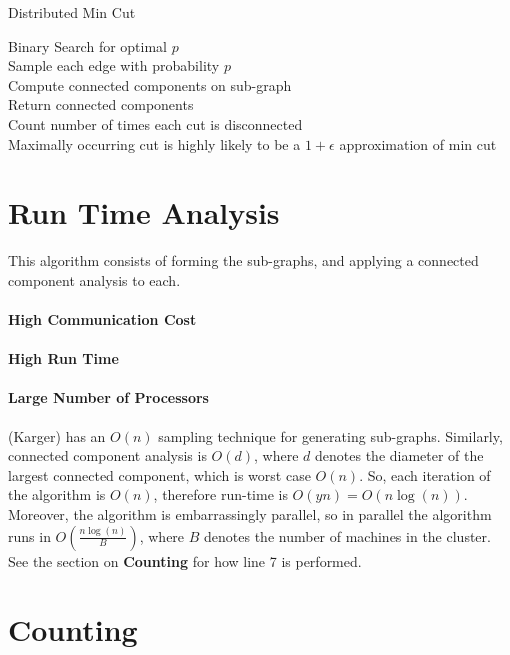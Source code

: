 \documentclass[12pt]{article}
\begin{document}
\LinesNumbered
\begin{algorithm}[H]
\caption{Distributed Min Cut}
Binary Search for optimal $p$ \\
Sample each edge with probability $p$ \\
\IP{}
{
  Compute connected components on sub-graph \\
  Return connected components \\
}
Count number of times each cut is disconnected \\
Maximally occurring cut is highly likely to be a $1+\epsilon$ approximation of min cut
\end{algorithm}

\section*{Run Time Analysis}

This algorithm consists of forming the sub-graphs, and applying a connected component analysis to each.

\paragraph{High Communication Cost}



\paragraph{High Run Time}

\paragraph{Large Number of Processors}




 (Karger) has an $O(n)$ sampling technique for generating sub-graphs. Similarly, connected component analysis is $O(d)$, where $d$ denotes the diameter of the largest connected component, which is worst case $O(n)$. So, each iteration of the algorithm is $O(n)$, therefore run-time is $O(yn) = O(n\log(n))$. Moreover, the algorithm is embarrassingly parallel, so in parallel the algorithm runs in $O(\frac{n \log(n)}{B})$, where $B$ denotes the number of machines in the cluster. See the section on \textbf{Counting} for how line 7 is performed.


\section*{Counting}
\end{document}

